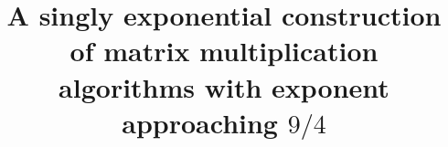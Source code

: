 \documentclass[11pt]{article}
\title{A singly exponential construction of matrix multiplication\\algorithms with exponent approaching \(9/4\)}
\author{}
\date{}
\theoremstyle{definition}
\theoremstyle{remark}
\numberwithin{equation}{section}
\begin{document}
\maketitle
\begin{abstract}

\end{abstract}









\appendix




\end{document}
